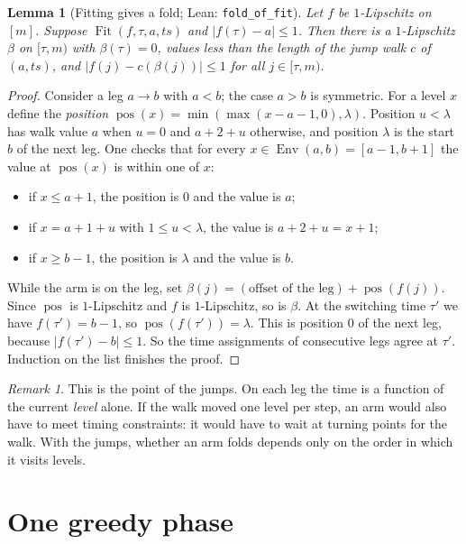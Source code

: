 \documentclass[11pt]{article}
\newtheorem{lemma}[theorem]{Lemma}
\theoremstyle{definition}
\theoremstyle{remark}
\newtheorem{remark}[theorem]{Remark}
\newcommand{\Env}{\operatorname{Env}}
\newcommand{\Fit}{\operatorname{Fit}}
\newcommand{\lean}[1]{\texttt{#1}}
\begin{document}
\begin{lemma}[Fitting gives a fold; Lean: \lean{fold\_of\_fit}]\label{lem:fold-of-fit}
Let $f$ be $1$-Lipschitz on $[m]$. Suppose $\Fit(f,\tau,a,ts)$ and
$|f(\tau)-a|\le1$. Then there is a $1$-Lipschitz $\beta$ on $[\tau,m)$ with
$\beta(\tau)=0$, values less than the length of the jump walk $c$ of $(a,ts)$,
and $|f(j)-c(\beta(j))|\le1$ for all $j\in[\tau,m)$.
\end{lemma}
\begin{proof}
Consider a leg $a\to b$ with $a<b$; the case $a>b$ is symmetric. For a level
$x$ define the \emph{position}
$\operatorname{pos}(x)=\min(\max(x-a-1,0),\lambda)$. Position $u<\lambda$ has
walk value $a$ when $u=0$ and $a+2+u$ otherwise, and position $\lambda$ is the
start $b$ of the next leg. One checks that for every
$x\in\Env(a,b)=[a-1,b+1]$ the value at $\operatorname{pos}(x)$ is within one of
$x$:
\begin{itemize}
\item if $x\le a+1$, the position is $0$ and the value is $a$;
\item if $x=a+1+u$ with $1\le u<\lambda$, the value is $a+2+u=x+1$;
\item if $x\ge b-1$, the position is $\lambda$ and the value is $b$.
\end{itemize}
While the arm is on the leg, set $\beta(j)=(\text{offset of the leg})+\operatorname{pos}(f(j))$.
Since $\operatorname{pos}$ is $1$-Lipschitz and $f$ is $1$-Lipschitz, so is
$\beta$. At the switching time $\tau'$ we have $f(\tau')=b-1$, so
$\operatorname{pos}(f(\tau'))=\lambda$. This is position $0$ of the next leg,
because $|f(\tau')-b|\le1$. So the time assignments of consecutive legs agree
at $\tau'$. Induction on the list finishes the proof.
\end{proof}

\begin{remark}
This is the point of the jumps. On each leg the time is a function of the
current \emph{level} alone. If the walk moved one level per step, an arm would
also have to meet timing constraints: it would have to wait at turning points
for the walk. With the jumps, whether an arm folds depends only on the order in
which it visits levels.
\end{remark}

\section{One greedy phase}\label{sec:phase}
\end{document}
